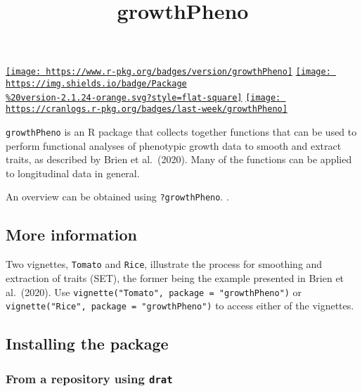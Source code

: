 \documentclass[
]{article}
\title{growthPheno}
\author{}
\date{\vspace{-2.5em}}
\begin{document}
\maketitle

\href{http://www.repostatus.org/\#active}{}
\href{https://cran.r-project.org/}{}
\href{https://cran.r-project.org/package=growthPheno}{\texttt{[image: https://www.r-pkg.org/badges/version/growthPheno]}}
\href{/commits/master}{\texttt{[image: https://img.shields.io/badge/Package\\\%20version-2.1.24-orange.svg?style=flat-square]}}
\href{/commits/master}{}
\href{http://choosealicense.com/licenses/gpl-2.0/}{}
\href{commits/master}{\texttt{[image: https://cranlogs.r-pkg.org/badges/last-week/growthPheno]}}

\texttt{growthPheno} is an R package that collects together functions
that can be used to perform functional analyses of phenotypic growth
data to smooth and extract traits, as described by Brien et al.~(2020).
Many of the functions can be applied to longitudinal data in general.

An overview can be obtained using \texttt{?growthPheno}. .

\hypertarget{more-information}{%
\subsection{More information}\label{more-information}}

Two vignettes, \texttt{Tomato} and \texttt{Rice}, illustrate the process
for smoothing and extraction of traits (SET), the former being the
example presented in Brien et al.~(2020). Use
\texttt{vignette("Tomato",\ package\ =\ "growthPheno")} or
\texttt{vignette("Rice",\ package\ =\ "growthPheno")} to access either
of the vignettes.

\hypertarget{installing-the-package}{%
\subsection{Installing the package}\label{installing-the-package}}

\hypertarget{from-a-repository-using-drat}{%
\subsubsection{\texorpdfstring{From a repository using
\texttt{drat}}{From a repository using drat}}\label{from-a-repository-using-drat}}
\end{document}
